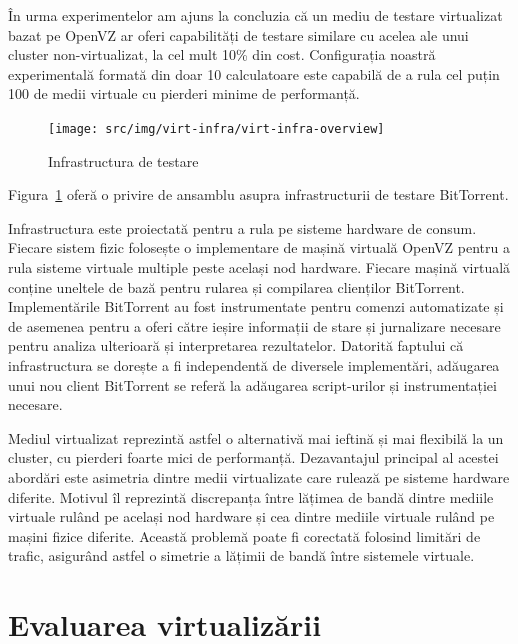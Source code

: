 
În urma experimentelor am ajuns la concluzia că un mediu de testare
virtualizat bazat pe OpenVZ ar oferi capabilități de testare similare cu
acelea ale unui cluster non-virtualizat, la cel mult 10\% din cost.
Configurația noastră experimentală formată din doar 10 calculatoare este
capabilă de a rula cel puțin 100 de medii virtuale cu pierderi minime
de performanță.

\begin{figure}
  \begin{center}
    \texttt{[image: src/img/virt-infra/virt-infra-overview]}
  \end{center}
  \caption{Infrastructura de testare}
  \label{fig:virt-infra:infrastructure-overview}
\end{figure}

Figura~\ref{fig:virt-infra:infrastructure-overview} oferă o privire
de ansamblu asupra infrastructurii de testare BitTorrent.

Infrastructura este proiectată pentru a rula pe sisteme hardware de
consum. Fiecare sistem fizic folosește o implementare de mașină virtuală
OpenVZ pentru a rula sisteme virtuale multiple peste același nod hardware.
Fiecare mașină virtuală conține uneltele de bază pentru rularea și compilarea
clienților BitTorrent. Implementările BitTorrent au fost instrumentate pentru
comenzi automatizate și de asemenea pentru a oferi către ieșire informații
de stare și jurnalizare necesare pentru analiza ulterioară și interpretarea
rezultatelor. Datorită faptului că infrastructura se dorește a fi
independentă de diversele implementări, adăugarea unui nou client BitTorrent
se referă la adăugarea script-urilor și instrumentației necesare.

Mediul virtualizat reprezintă astfel o alternativă mai ieftină și mai
flexibilă la un cluster, cu pierderi foarte mici de performanță.
Dezavantajul principal al acestei abordări este asimetria dintre medii
virtualizate care rulează pe sisteme hardware diferite. Motivul îl
reprezintă discrepanța între lățimea de bandă dintre mediile virtuale
rulând pe același nod hardware și cea dintre mediile virtuale rulând pe
mașini fizice diferite. Această problemă poate fi corectată folosind
limitări de trafic, asigurând astfel o simetrie a lățimii de bandă între
sistemele virtuale.

\section{Evaluarea virtualizării}

